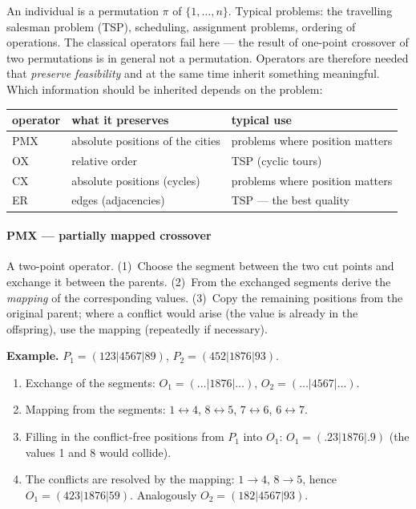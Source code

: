 \documentclass[11pt,a4paper]{article}
\theoremstyle{definition}
\begin{document}
An individual is a permutation $\pi$ of $\{1,\dots,n\}$. Typical problems: the
travelling salesman problem (TSP), scheduling, assignment problems, ordering of
operations. The classical operators fail here --- the result of one-point
crossover of two permutations is in general not a permutation. Operators are
therefore needed that \emph{preserve feasibility} and at the same time inherit
something meaningful. Which information should be inherited depends on the
problem:

\begin{center}
\begin{tabular}{@{}lll@{}}
\toprule
\textbf{operator} & \textbf{what it preserves} & \textbf{typical use} \\
\midrule
PMX & absolute positions of the cities & problems where position matters \\
OX & relative order & TSP (cyclic tours) \\
CX & absolute positions (cycles) & problems where position matters \\
ER & edges (adjacencies) & TSP --- the best quality \\
\bottomrule
\end{tabular}
\end{center}

\paragraph{PMX --- partially mapped crossover}

\begin{defbox}
A two-point operator. (1)~Choose the segment between the two cut points and
exchange it between the parents. (2)~From the exchanged segments derive the
\emph{mapping} of the corresponding values. (3)~Copy the remaining positions
from the original parent; where a conflict would arise (the value is already in
the offspring), use the mapping (repeatedly if necessary).
\end{defbox}

\textbf{Example.} $P_1 = (123|4567|89)$, $P_2 = (452|1876|93)$.
\begin{enumerate}
\item Exchange of the segments: $O_1 = (\ldots|1876|\ldots)$,
  $O_2 = (\ldots|4567|\ldots)$.
\item Mapping from the segments: $1{\leftrightarrow}4$, $8{\leftrightarrow}5$,
  $7{\leftrightarrow}6$, $6{\leftrightarrow}7$.
\item Filling in the conflict-free positions from $P_1$ into $O_1$:
  $O_1 = (.23|1876|.9)$ (the values 1 and 8 would collide).
\item The conflicts are resolved by the mapping: $1 \to 4$, $8 \to 5$, hence
  $O_1 = (423|1876|59)$. Analogously $O_2 = (182|4567|93)$.
\end{enumerate}
\end{document}
